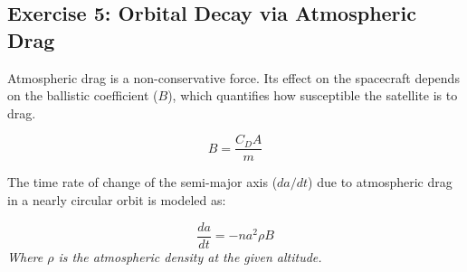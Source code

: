 \documentclass[12pt]{article}
\begin{document}
\subsection*{Exercise 5: Orbital Decay via Atmospheric Drag}
Atmospheric drag is a non-conservative force. Its effect on the spacecraft depends on the ballistic coefficient ($B$), which quantifies how susceptible the satellite is to drag.

\begin{equation}
    B = \frac{C_D A}{m}
\end{equation}

The time rate of change of the semi-major axis ($da/dt$) due to atmospheric drag in a nearly circular orbit is modeled as:

\begin{equation}
    \frac{da}{dt} = -n a^2 \rho B
\end{equation}
\textit{Where $\rho$ is the atmospheric density at the given altitude.}
\end{document}
